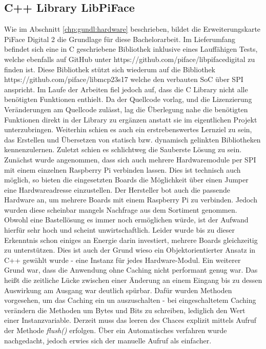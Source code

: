\subsection{C++ Library LibPiFace}
Wie im Abschnitt \ref{chp:gundl:hardware} beschrieben, bildet die Erweiterungskarte PiFace Digital 2 \cite{URL:PiFaceDigital2} die Grundlage für diese Bachelorarbeit. Im Lieferumfang befindet sich eine in C geschriebene Bibliothek inklusive eines Lauffähigen Tests, welche ebenfalls auf GitHub unter https://github.com/piface/libpifacedigital zu finden ist. Diese Bibliothek stützt sich wiederum auf die Bibliothek https://github.com/piface/libmcp23s17 welche den verbauten SoC über SPI anspricht. Im Laufe der Arbeiten fiel jedoch auf, dass die C Library nicht alle benötigten Funktionen enthielt. Da der Quellcode vorlag, und die Lizenzierung Veränderungen am Quellcode zulässt, lag die Überlegung nahe die benötigten Funktionen direkt in der Library zu ergänzen anstatt sie im eigentlichen Projekt unterzubringen. Weiterhin schien es auch ein erstrebenswertes Lernziel zu sein, das Erstellen und Übersetzen von statisch bzw. dynamisch gelinkten Bibliotheken kennenzulernen. Zuletzt schien es schlichtweg die Sauberste Lösung zu sein. Zunächst wurde angenommen, dass sich auch mehrere Hardwaremodule per SPI mit einem einzelnen Raspberry Pi verbinden lassen. Dies ist technisch auch möglich, so bieten die eingesetzten Boards die Möglichkeit über einen Jumper eine Hardwareadresse einzustellen. Der Hersteller bot auch die passende Hardware an, um mehrere Boards mit einem Raspberry Pi zu verbinden. Jedoch wurden diese scheinbar mangels Nachfrage aus dem Sortiment genommen. Obwohl eine Bastellösung es immer noch ermöglichen würde, ist der Aufwand hierfür sehr hoch und scheint unwirtschaftlich. Leider wurde bis zu dieser Erkenntnis schon einiges an Energie darin investiert, mehrere Boards gleichzeitig zu unterstützen. Dies ist auch der Grund wieso ein Objektorientierter Ansatz in C++ gewählt wurde - eine Instanz für jedes Hardware-Modul. Ein weiterer Grund war, dass die Anwendung ohne Caching nicht performant genug war. Das heißt die zeitliche Lücke zwischen einer Änderung an einem Eingang bis zu dessen Auswirkung am Ausgang war deutlich spürbar. Dafür wurden Methoden vorgesehen, um das Caching ein un auszuschalten - bei eingeschaltetem Caching verändern die Methoden um Bytes und Bits zu schreiben, lediglich den Wert einer Instanzvariable. Derzeit muss das leeren des Chaces explizit mittels Aufruf der Methode \textit{flush()} erfolgen. Über ein Automatisches verfahren wurde nachgedacht, jedoch erwies sich der manuelle Aufruf als einfacher. 

